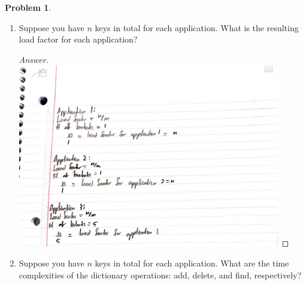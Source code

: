 \documentclass[11pt]{article}
\theoremstyle{definition}
\theoremstyle{definition}
\newtheorem{required}{Problem}
\theoremstyle{definition}
\begin{document}
\begin{required}
\begin{enumerate}[label=(\alph*)]
\begin{proof}[Answer]
\textbf{Scenario 2:} Would not satisfy the uniform hashing property because it would satisfy the second condition where two keys $k$ are independent, but it will fail the first one where the probability of hashing any key into any index should be $\frac{1}{5}$ however it is not as the probability of hashing the key into bucket 1 will always be 1, because the key will always have a remainder of 1 by the definition of the scenario and h(k). The probability of hashing any other key into another would be 0. Thus it does not satisfy the uniform hashing property. \\ 

\textbf{Scenario 3:} This scenario would satisfy the uniform hashing property because the second condition will be satisfied such that two keys within h(k) are independent from one another. This scenario would also satisfy the first condition because we are drawing the keys randomly from all integers, the probability of hashing the key into any of the 5 buckets will be $\frac{1}{5}$, where 5 represents $m$ or the number of buckets. 
\end{proof}

\newpage

\item Suppose you have $n$ keys in total for each application. What is the resulting load factor for each application?

\begin{proof}[Answer]
\includegraphics[width=0.9\textwidth]{M2S26Q3.pdf}

\end{proof}

\newpage

\item Suppose you have $n$ keys in total for each application. What are the time complexities of the dictionary operations: add, delete, and find, respectively?


\end{enumerate}
\end{required}
\end{document}
